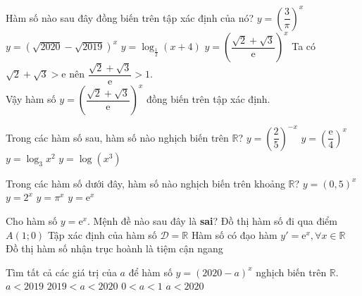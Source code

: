 \begin{ex}
	Hàm số nào sau đây đồng biến trên tập xác định của nó?
	\choice
	{$y=\left(\dfrac{3}{\pi}\right)^{x}$}
	{$y=\left(\sqrt{2020}-\sqrt{2019}\right)^{x}$}
	{$y=\log_{\tfrac{1}{2}} (x+4)$}
	{\True $y=\left(\dfrac{\sqrt{2}+\sqrt{3}}{\mathrm{e}}\right)^{x}$}
	\loigiai
	{
		Ta có $\sqrt{2}+\sqrt{3}>\mathrm{e}$ nên $\dfrac{\sqrt{2}+\sqrt{3}}{\mathrm{e}}>1$. \\
		Vậy hàm số $y=\left(\dfrac{\sqrt{2}+\sqrt{3}}{\mathrm{e}}\right)^{x}$ đồng biến trên tập xác định.
	}
\end{ex}

\begin{ex}
	Trong các hàm số sau, hàm số nào nghịch biến trên $\mathbb{R}$?
	\choice
	{$y=\left(\dfrac{2}{5}\right)^{-x}$}
	{\True $y=\left(\dfrac{\mathrm{e}}{4}\right)^{x}$}
	{$y=\log _{3} x^{2}$}
	{$y=\log \left(x^{3}\right)$}
\end{ex}


\begin{ex}
	Trong các hàm số dưới đây, hàm số nào nghịch biến trên khoảng $\mathbb{R}$?
	\choice
	{\True $y=(0{,}5)^x$}
	{$y=2^x$}
	{$y=\pi^x$}
	{$y=\mathrm{e}^x$}
\end{ex}

\begin{ex}
	Cho hàm số $y=\mathrm{e}^x$. Mệnh đề nào sau đây là \textbf{sai}?
	\choice
	{\True Đồ thị hàm số đi qua điểm $A(1;0)$}
	{Tập xác định của hàm số $\mathscr{D}=\mathbb{R}$}
	{Hàm số có đạo hàm $y'=\mathrm{e}^x, \forall x \in \mathbb{R}$}
	{Đồ thị hàm số nhận trục hoành là tiệm cận ngang}
\end{ex}

\begin{ex}
	Tìm tất cả các giá trị của $a$ để hàm số $y = (2020 - a)^x$ nghịch biến trên $\mathbb{R}$.
	\choice
	{$ a<2019$}
	{\True $2019 < a < 2020 $}
	{$ 0<a<1 $}
	{$ a<2020 $}
\end{ex}


